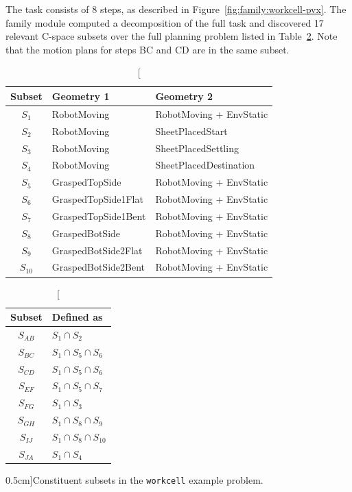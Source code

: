 The task consists of 8 steps,
as described in Figure~\ref{fig:family:workcell-pvx}.
The family module computed a decomposition of the full task
and discovered 17 relevant C-space subsets
over the full planning problem
listed in Table~\ref{table:family:workcell-subsets}.
Note that the motion plans for steps BC and CD are in the same
subset.

\begin{table}
   \centering
   \begin{minipage}[t]{.65\textwidth}
   \begin{tabular}{cll}
      \toprule
      Subset & Geometry 1 & Geometry 2 \\
      \midrule
      $S_1$  & RobotMoving & RobotMoving + EnvStatic \\
      $S_2$  & RobotMoving & SheetPlacedStart \\
      $S_3$  & RobotMoving & SheetPlacedSettling \\
      $S_4$  & RobotMoving & SheetPlacedDestination \\
      $S_5$  & GraspedTopSide & RobotMoving + EnvStatic \\
      $S_6$  & GraspedTopSide1Flat & RobotMoving + EnvStatic \\
      $S_7$  & GraspedTopSide1Bent & RobotMoving + EnvStatic \\
      $S_8$  & GraspedBotSide & RobotMoving + EnvStatic \\
      $S_9$  & GraspedBotSide2Flat & RobotMoving + EnvStatic \\
      $S_{10}$ & GraspedBotSide2Bent & RobotMoving + EnvStatic \\
      \bottomrule
   \end{tabular}
   \end{minipage}
   \begin{minipage}[t]{.30\textwidth}
   \begin{tabular}{cl}
      \toprule
      Subset & Defined as \\
      \midrule
      $S_{AB}$  & $S_1 \cap S_2$ \\
      $S_{BC}$  & $S_1 \cap S_5 \cap S_6$ \\
      $S_{CD}$  & $S_1 \cap S_5 \cap S_6$ \\
      $S_{EF}$  & $S_1 \cap S_5 \cap S_7$ \\
      $S_{FG}$  & $S_1 \cap S_3$ \\
      $S_{GH}$  & $S_1 \cap S_8 \cap S_9$ \\
      $S_{IJ}$  & $S_1 \cap S_8 \cap S_{10}$ \\
      $S_{JA}$  & $S_1 \cap S_4$ \\
      \bottomrule
   \end{tabular}
   \end{minipage}
   \caption[][0.5cm]{Constituent subsets in the \texttt{workcell} example
      problem.}
   \label{table:family:workcell-subsets}
\end{table}

